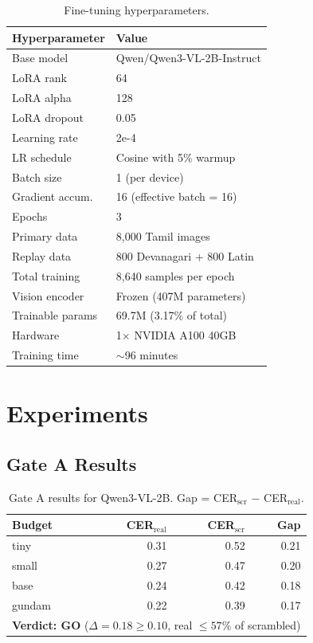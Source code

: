 \documentclass[11pt,a4paper]{article}
\begin{document}
\begin{table}[h]
\centering
\caption{Fine-tuning hyperparameters.}
\label{tab:hparams}
\begin{tabular}{ll}
\toprule
Hyperparameter & Value \\
\midrule
Base model        & Qwen/Qwen3-VL-2B-Instruct \\
LoRA rank         & 64 \\
LoRA alpha        & 128 \\
LoRA dropout      & 0.05 \\
Learning rate     & 2e-4 \\
LR schedule       & Cosine with 5\% warmup \\
Batch size        & 1 (per device) \\
Gradient accum.   & 16 (effective batch = 16) \\
Epochs            & 3 \\
Primary data      & 8,000 Tamil images \\
Replay data       & 800 Devanagari + 800 Latin \\
Total training    & 8,640 samples per epoch \\
Vision encoder    & Frozen (407M parameters) \\
Trainable params  & 69.7M (3.17\% of total) \\
Hardware          & 1$\times$ NVIDIA A100 40GB \\
Training time     & $\sim$96 minutes \\
\bottomrule
\end{tabular}
\end{table}

\section{Experiments}
\label{sec:experiments}

\subsection{Gate A Results}

\begin{table}[h]
\centering
\caption{Gate A results for Qwen3-VL-2B. Gap = CER$_\text{scr}$ $-$ CER$_\text{real}$.}
\label{tab:gate_a}
\begin{tabular}{lrrr}
\toprule
Budget & CER$_\text{real}$ & CER$_\text{scr}$ & Gap \\
\midrule
tiny    & 0.31 & 0.52 & 0.21 \\
small   & 0.27 & 0.47 & 0.20 \\
base    & 0.24 & 0.42 & 0.18 \\
gundam  & 0.22 & 0.39 & 0.17 \\
\midrule
\multicolumn{4}{l}{\textbf{Verdict: GO} ($\Delta = 0.18 \geq 0.10$, real $\leq 57\%$ of scrambled)} \\
\bottomrule
\end{tabular}
\end{table}
\end{document}
